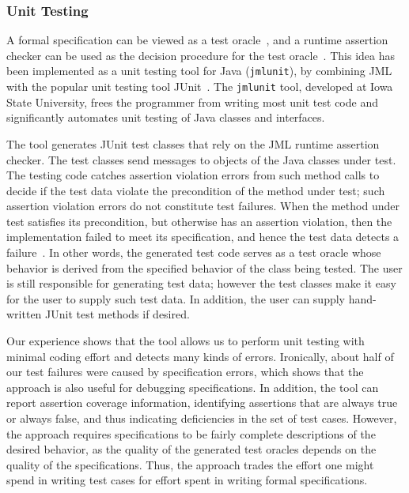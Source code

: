 \subsubsection{Unit Testing}
\label{jmlunit}

A formal specification can be viewed as a test
oracle~\cite{Peters-Parnas98,Antoy-Hamlet00}, and a runtime assertion
checker can be used as the decision procedure for the test
oracle~\cite{Cheon-Leavens02}.  This idea has been implemented as a
unit testing tool for Java (\texttt{jmlunit}), by combining JML with
the popular unit testing tool JUnit~\cite{Beck-Gamma98}.  The
\texttt{jmlunit} tool, developed at Iowa State University, frees the
programmer from writing most unit test code and significantly
automates unit testing of Java classes and interfaces.

The tool generates JUnit test classes that rely on the JML runtime
assertion checker.  The test classes send messages to objects of the
Java classes under test.  The testing code catches assertion violation
errors from such method calls to decide if the test data violate the
precondition of the method under test; such assertion violation errors
do not constitute test failures.  When the method under test satisfies
its precondition, but otherwise has an assertion violation, then the
implementation failed to meet its specification, and hence the test
data detects a failure~\cite{Cheon-Leavens02}.  In other words, the
generated test code serves as a test oracle whose behavior is derived
from the specified behavior of the class being tested.  The user is
still responsible for generating test data; however the test classes
make it easy for the user to supply such test data. In addition, the
user can supply hand-written JUnit test methods if desired.

Our experience shows that the tool allows us to perform unit testing
with minimal coding effort and detects many kinds of errors.
Ironically, about half of our test failures were caused by
specification errors, which shows that the approach is also useful for
debugging specifications.  In addition, the tool can report assertion coverage
information, identifying assertions that are always true or always
false, and thus indicating deficiencies in the set of test cases.
However, the approach requires specifications to be fairly complete
descriptions of the desired behavior, as the quality of the generated
test oracles depends on the quality of the specifications. Thus, the
approach trades the effort one might spend in writing test cases for
effort spent in writing formal specifications.

